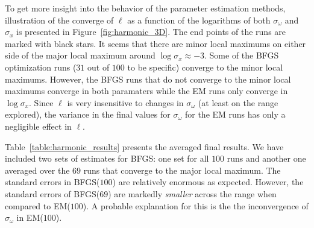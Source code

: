 To get more insight into the behavior of the parameter estimation methods, 
illustration of the converge of $\ell$ as a function of
the logarithms of both $\sigma_\omega$ and $\sigma_x$ is presented
in Figure~\ref{fig:harmonic_3D}. The end points of the runs are marked with black stars.
It seems that there are minor local maximums on either side of the major local maximum
around $\log\sigma_x\approx -3$. Some of the BFGS optimization runs ($31$ out of $100$ to be specific) 
converge to the minor local maximums. However, the BFGS runs that do not converge to the
minor local maximums converge in both paramaters while the EM runs only converge in $\log\sigma_x$.
Since $\ell$ is very insensitive to changes in $\sigma_\omega$ (at least on the range explored),
the variance in the final values for $\sigma_\omega$ for the EM runs has only a negligible
effect in $\ell$.  

Table~\ref{table:harmonic_results} presents 
the averaged final results. We have included two sets of estimates for BFGS:
one set for all $100$ runs and another one averaged over the $69$ runs
that converge to the major local maximum. The standard errors in
BFGS($100$) are relatively enormous as expected. However, the standard errors
of BFGS($69$) are markedly \emph{smaller} across the range when compared to
EM($100$). A probable explanation for this is the the inconvergence of
 $\sigma_\omega$ in EM($100$).



\begin{table}[htbp]
\caption{Parameter values used in the PPG analysis in Section~\ref{sec:harmonic}}
\label{table:harmonic_param}
\centering
\footnotesize
{}
\end{table}

